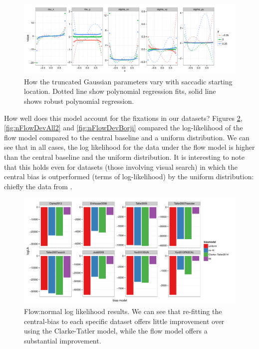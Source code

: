 \begin{figure}
\centering
\includegraphics[width=16cm]{../scripts/flow/figs/NparamsChagingOverSpace_ALL_tN}
\caption{How the truncated Gaussian parameters vary with saccadic starting location. Dotted line show polynomial regression fits, solid line shows robust polynomial regression.}
\label{fig:nParamsOverSpace}
\end{figure}


How well does this model account for the fixations in our datasets? Figures \ref{fig:nFlowDevAll}, \ref{fig:nFlowDevAll2} and \ref{fig:nFlowDevBorji} compared the log-likelihood of the flow model compared to the \cite{clarke-tatler2014} central baseline and a uniform distribution. We can see that in all cases, the log likelihood for the data under the flow model is higher than the central baseline and the uniform distribution. It is interesting to note that this holds even for datasets (those involving visual search) in which the central bias is outperformed (terms of log-likelihood) by the uniform distribution: chiefly the data from \cite{clarke2009,asher2013,tatler2007}. 



\begin{figure}
\centering
 \includegraphics[width=12cm]{../scripts/flow/figs/llh_training.pdf}
\caption{Flow:normal log likelihood results. We can see that re-fitting the central-bias to each specific dataset offers little improvement over using the Clarke-Tatler model, while the flow model offers a substantial improvement.}
\label{fig:nFlowDevAll}
\end{figure}

